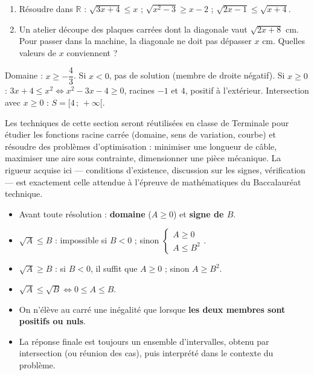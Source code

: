 \documentclass[11pt]{article}
\newcommand{\cle}[1]{{\popxbold\color{popdark}#1}}
\begin{document}
\begin{exercice}[À faire]
\begin{enumerate}
\item Résoudre dans $\mathbb{R}$ : $\sqrt{3x+4} \leq x$ ; $\sqrt{x^2 - 3} \geq x - 2$ ; $\sqrt{2x-1} \leq \sqrt{x+4}$.
\item Un atelier découpe des plaques carrées dont la diagonale vaut $\sqrt{2x+8}$ cm. Pour passer dans la machine, la diagonale ne doit pas dépasser $x$ cm. Quelles valeurs de $x$ conviennent ?
\end{enumerate}
\end{exercice}

\begin{corrige}
Domaine : $x \geq -\dfrac{4}{3}$. Si $x < 0$, pas de solution (membre de droite négatif). Si $x \geq 0$ : $3x + 4 \leq x^2 \iff x^2 - 3x - 4 \geq 0$, racines $-1$ et $4$, positif à l'extérieur. Intersection avec $x \geq 0$ : $S = [4\,;\,+\infty[$.
\end{corrige}

\begin{savaistu}
Les techniques de cette section seront réutilisées en classe de Terminale pour étudier les \cle{fonctions racine carrée} (domaine, sens de variation, courbe) et résoudre des problèmes d'\cle{optimisation} : minimiser une longueur de câble, maximiser une aire sous contrainte, dimensionner une pièce mécanique. La rigueur acquise ici — conditions d'existence, discussion sur les signes, vérification — est exactement celle attendue à l'épreuve de mathématiques du Baccalauréat technique.
\end{savaistu}

\begin{aretenir}
\begin{itemize}
\item Avant toute résolution : \textbf{domaine} ($A \geq 0$) et \textbf{signe de $B$}.
\item $\sqrt{A} \leq B$ : impossible si $B<0$ ; sinon $\begin{cases} A \geq 0 \\ A \leq B^2 \end{cases}$.
\item $\sqrt{A} \geq B$ : si $B<0$, il suffit que $A \geq 0$ ; sinon $A \geq B^2$.
\item $\sqrt{A} \leq \sqrt{B} \iff 0 \leq A \leq B$.
\item On n'élève au carré une inégalité que lorsque \textbf{les deux membres sont positifs ou nuls}.
\item La réponse finale est toujours un ensemble d'intervalles, obtenu par intersection (ou réunion des cas), puis interprété dans le contexte du problème.
\end{itemize}
\end{aretenir}
\end{document}
